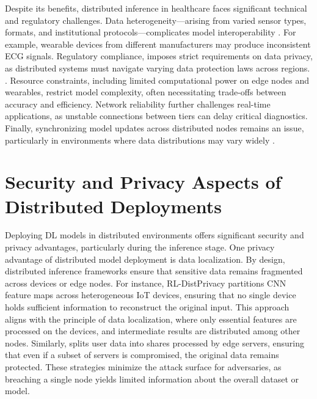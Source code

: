 \documentclass[conference]{IEEEtran}
\begin{document}
Despite its benefits, distributed inference in healthcare faces significant technical and regulatory challenges. Data heterogeneity—arising from varied sensor types, formats, and institutional protocols—complicates model interoperability \cite{akdemir2025technical}. For example, wearable devices from different manufacturers may produce inconsistent ECG signals. Regulatory compliance, imposes strict requirements on data privacy, as distributed systems must navigate varying data protection laws across regions. \cite{akdemir2025technical, tuli2020healthfog}. Resource constraints, including limited computational power on edge nodes and wearables, restrict model complexity, often necessitating trade-offs between accuracy and efficiency. Network reliability further challenges real-time applications, as unstable connections between tiers can delay critical diagnostics. Finally, synchronizing model updates across distributed nodes remains an issue, particularly in environments where data distributions may vary widely \cite{akdemir2025technical, al2022machine}.








\section{Security and Privacy Aspects of Distributed Deployments}

Deploying DL models in distributed environments offers significant security and privacy advantages, particularly during the inference stage. One privacy advantage of distributed model deployment is data localization. By design, distributed inference frameworks ensure that sensitive data remains fragmented across devices or edge nodes. For instance, RL-DistPrivacy \cite{baccour2022rl} partitions CNN feature maps across heterogeneous IoT devices, ensuring that no single device holds sufficient information to reconstruct the original input. This approach aligns with the principle of data localization, where only essential features are processed on the devices, and intermediate results are distributed among other nodes. Similarly, \cite{schlegel2022privacy} splits user data into shares processed by edge servers, ensuring that even if a subset of servers is compromised, the original data remains protected. These strategies minimize the attack surface for adversaries, as breaching a single node yields limited information about the overall dataset or model. 
\end{document}
